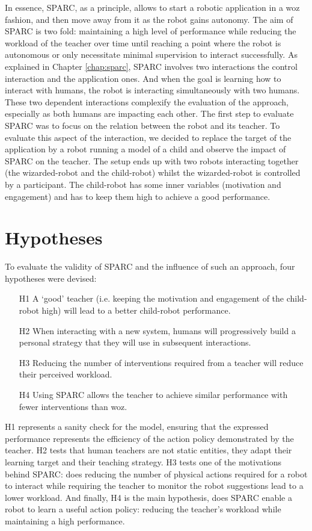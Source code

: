 In essence, SPARC, as a principle, allows to start a robotic application in a \gls{woz} fashion, and then move away from it as the robot gains autonomy. The aim of SPARC is two fold: maintaining a high level of performance while reducing the workload of the teacher over time until reaching a point where the robot is autonomous or only necessitate minimal supervision to interact successfully. As explained in Chapter \ref{chap:sparc}, SPARC involves two interactions the control interaction and the application ones. And when the goal is learning how to interact with humans, the robot is interacting simultaneously with two humans. These two dependent interactions complexify the evaluation of the approach, especially as both humans are impacting each other. The first step to evaluate SPARC was to focus on the relation between the robot and its teacher. To evaluate this aspect of the interaction, we decided to replace the target of the application by a robot running a model of a child and observe the impact of SPARC on the teacher. The setup ends up with two robots interacting together (the wizarded-robot and the child-robot) whilst the wizarded-robot is controlled by a participant. The child-robot has some inner variables (motivation and engagement) and has to keep them high to achieve a good performance.

\section{Hypotheses}

To evaluate the validity of SPARC and the influence of such an approach, four hypotheses were devised:
\begin{enumerate}
	\item [H1] A `good' teacher (i.e. keeping the motivation and engagement of the child-robot high) will lead to a better child-robot performance.
	\item [H2] When interacting with a new system, humans will progressively build a personal strategy that they will use in subsequent interactions.
	\item [H3] Reducing the number of interventions required from a teacher will reduce their perceived workload.
	\item [H4] Using SPARC allows the teacher to achieve similar performance with fewer interventions than \gls{woz}.
\end{enumerate}

H1 represents a sanity check for the model, ensuring that the expressed performance represents the efficiency of the action policy demonstrated by the teacher. H2 tests that human teachers are not static entities, they adapt their learning target and their teaching strategy. H3 tests one of the motivations behind SPARC: does reducing the number of physical actions required for a robot to interact while requiring the teacher to monitor the robot suggestions lead to a lower workload. And finally, H4 is the main hypothesis, does SPARC enable a robot to learn a useful action policy: reducing the teacher's workload while maintaining a high performance.

